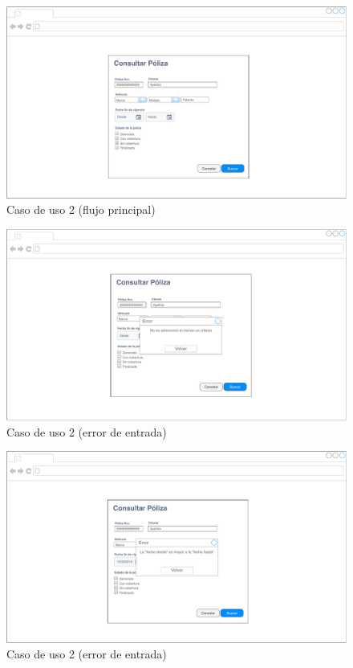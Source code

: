\documentclass[12pt]{article}
\begin{document}
\vfill
\begin{figure}[h!]
\includegraphics[width=\textwidth]{CU2/CU-021.pdf}
\caption{Caso de uso 2 (flujo principal)}
\end{figure}
\vfill

\vfill
\begin{figure}[h!]
\includegraphics[width=\textwidth]{CU2/CU-022.pdf}
\caption{Caso de uso 2 (error de entrada)}
\end{figure}
\vfill

\vfill
\begin{figure}[h!]
\includegraphics[width=\textwidth]{CU2/CU-023.pdf}
\caption{Caso de uso 2 (error de entrada)}
\end{figure}
\vfill
\end{document}
